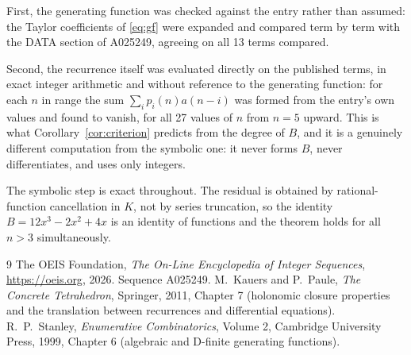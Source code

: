 \documentclass[11pt,a4paper]{article}
\theoremstyle{plain}
\theoremstyle{definition}
\begin{document}
First, the generating function was checked against the entry rather than assumed: the
Taylor coefficients of \eqref{eq:gf} were expanded and compared term by term with the DATA
section of A025249, agreeing on all 13 terms compared.

Second, the recurrence itself was evaluated directly on the published terms, in exact
integer arithmetic and without reference to the generating function: for each $n$ in range
the sum $\sum_{i}p_{i}(n)a(n-i)$ was formed from the entry's own values and found to
vanish, for all 27 values of $n$ from $n=5$ upward. This is what
Corollary~\ref{cor:criterion} predicts from the degree of $B$, and it is a genuinely
different computation from the symbolic one: it never forms $B$, never differentiates, and
uses only integers.

The symbolic step is exact throughout. The residual is obtained by rational-function
cancellation in $K$, not by series truncation, so the identity $B=12 x^{3} - 2 x^{2} + 4 x$ is an
identity of functions and the theorem holds for all $n>3$ simultaneously.

\begin{thebibliography}{9}
 The OEIS Foundation, \emph{The On-Line Encyclopedia of Integer Sequences},
\url{https://oeis.org}, 2026. Sequence A025249.
 M.~Kauers and P.~Paule, \emph{The Concrete Tetrahedron}, Springer, 2011,
Chapter 7 (holonomic closure properties and the translation between recurrences and
differential equations).
 R.~P.~Stanley, \emph{Enumerative Combinatorics}, Volume 2, Cambridge
University Press, 1999, Chapter 6 (algebraic and D-finite generating functions).
\end{thebibliography}
\end{document}
